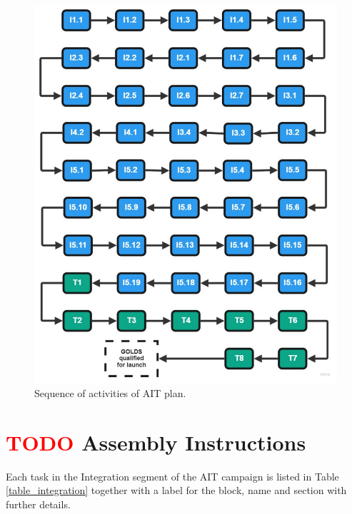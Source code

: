 \begin{figure}[!htb]
\centering
\includegraphics[scale=0.45]{figures/Assembly and Tests chart.pdf}
\caption{Sequence of activities of AIT plan.}
\label{fig:sequence}
\end{figure}

\section{ \textcolor{red}{TODO} Assembly Instructions}
Each task in the Integration segment of the AIT campaign is listed in Table \ref{table_integration} together with a label for the block, name and section with further details. %



